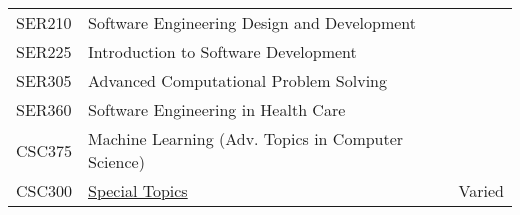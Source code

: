 \documentclass{article}
\begin{document}
\begin{longtable}{lll}
  SER210  &  Software Engineering Design and Development & \pageref{SER210}\\
  SER225  &  Introduction to Software Development & \pageref{SER225}\\
  SER305  &  Advanced Computational Problem Solving & \pageref{SER305}\\
  SER360  & Software Engineering in Health Care   & \pageref{SER360}\\
  CSC375  & Machine Learning (Adv. Topics in Computer Science) & \pageref{CSC375-ML} \\
  CSC300  &  \underline{Special Topics}          & Varied \\                       %
\end{longtable}

\newpage

\newpage

\newpage

\newpage

\newpage

\newpage

\newpage

\newpage


\newpage

\newpage

\newpage

\newpage

\newpage

\newpage



\newpage

\newpage

\newpage

\newpage

\newpage

\newpage


\end{document}
